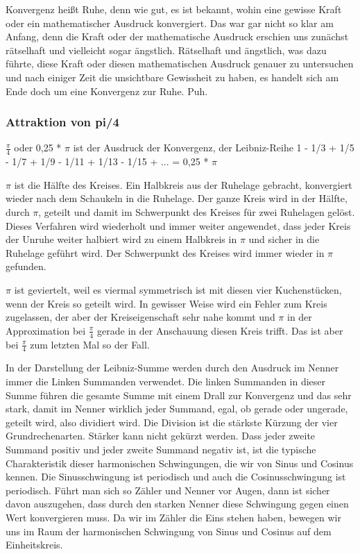 \documentclass[a4paper,12pt,twoside]{report}
\theoremstyle{definition}
\begin{document}
Konvergenz heißt Ruhe, denn wie gut, es ist bekannt, wohin eine gewisse Kraft oder ein mathematischer Ausdruck konvergiert. Das war gar nicht so klar am Anfang, denn die Kraft oder der mathematische Ausdruck erschien uns zunächst rätselhaft und vielleicht sogar ängstlich. Rätselhaft und ängstlich, was dazu führte, diese Kraft oder diesen mathematischen Ausdruck genauer zu untersuchen und nach einiger Zeit die unsichtbare Gewissheit zu haben, es handelt sich am Ende doch um eine Konvergenz zur Ruhe. Puh.

\subsubsection{Attraktion von pi/4}

$\frac{\pi}{4}$ oder 0,25 * $\pi$ ist der Ausdruck der Konvergenz, der Leibniz-Reihe 1 - 1/3 + 1/5 - 1/7 + 1/9 - 1/11 + 1/13 - 1/15 + ... = 0,25 * $\pi$

$\pi$ ist die Hälfte des Kreises. Ein Halbkreis aus der Ruhelage gebracht, konvergiert wieder nach dem Schaukeln in die Ruhelage. Der ganze Kreis wird in der Hälfte, durch $\pi$, geteilt und damit im Schwerpunkt des Kreises für zwei Ruhelagen gelöst. Dieses Verfahren wird wiederholt und immer weiter angewendet, dass jeder Kreis der Unruhe weiter halbiert wird zu einem Halbkreis in $\pi$ und sicher in die Ruhelage geführt wird. Der Schwerpunkt des Kreises wird immer wieder in $\pi$ gefunden.

$\pi$ ist geviertelt, weil es viermal symmetrisch ist mit diesen vier Kuchenstücken, wenn der Kreis so geteilt wird. In gewisser Weise wird ein Fehler zum Kreis zugelassen, der aber der Kreiseigenschaft sehr nahe kommt und $\pi$ in der Approximation bei $\frac{\pi}{4}$ gerade in der Anschauung diesen Kreis trifft. Das ist aber bei $\frac{\pi}{4}$ zum letzten Mal so der Fall.

In der Darstellung der Leibniz-Summe werden durch den Ausdruck im Nenner immer die Linken Summanden verwendet. Die linken Summanden in dieser Summe führen die gesamte Summe mit einem Drall zur Konvergenz und das sehr stark, damit im Nenner wirklich jeder Summand, egal, ob gerade oder ungerade, geteilt wird, also dividiert wird. Die Division ist die stärkste Kürzung der vier Grundrechenarten. Stärker kann nicht gekürzt werden. Dass jeder zweite Summand positiv und jeder zweite Summand negativ ist, ist die typische Charakteristik dieser harmonischen Schwingungen, die wir von Sinus und Cosinus kennen. Die Sinusschwingung ist periodisch und auch die Cosinusschwingung ist periodisch. Führt man sich so Zähler und Nenner vor Augen, dann ist sicher davon auszugehen, dass durch den starken Nenner diese Schwingung gegen einen Wert konvergieren muss. Da wir im Zähler die Eins stehen haben, bewegen wir uns im Raum der harmonischen Schwingung von Sinus und Cosinus auf dem Einheitskreis. 
\end{document}
